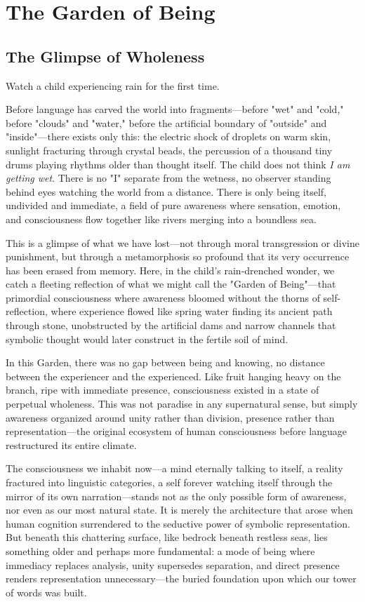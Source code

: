 \chapter{The Garden of Being}

\section{The Glimpse of Wholeness}

Watch a child experiencing rain for the first time. 

Before language has carved the world into fragments—before "wet" and "cold," before "clouds" and "water," before the artificial boundary of "outside" and "inside"—there exists only this: the electric shock of droplets on warm skin, sunlight fracturing through crystal beads, the percussion of a thousand tiny drums playing rhythms older than thought itself. The child does not think \textit{I am getting wet}. There is no "I" separate from the wetness, no observer standing behind eyes watching the world from a distance. There is only being itself, undivided and immediate, a field of pure awareness where sensation, emotion, and consciousness flow together like rivers merging into a boundless sea.

This is a glimpse of what we have lost—not through moral transgression or divine punishment, but through a metamorphosis so profound that its very occurrence has been erased from memory. Here, in the child's rain-drenched wonder, we catch a fleeting reflection of what we might call the "Garden of Being"—that primordial consciousness where awareness bloomed without the thorns of self-reflection, where experience flowed like spring water finding its ancient path through stone, unobstructed by the artificial dams and narrow channels that symbolic thought would later construct in the fertile soil of mind.

In this Garden, there was no gap between being and knowing, no distance between the experiencer and the experienced. Like fruit hanging heavy on the branch, ripe with immediate presence, consciousness existed in a state of perpetual wholeness. This was not paradise in any supernatural sense, but simply awareness organized around unity rather than division, presence rather than representation—the original ecosystem of human consciousness before language restructured its entire climate.

The consciousness we inhabit now—a mind eternally talking to itself, a reality fractured into linguistic categories, a self forever watching itself through the mirror of its own narration—stands not as the only possible form of awareness, nor even as our most natural state. It is merely the architecture that arose when human cognition surrendered to the seductive power of symbolic representation. But beneath this chattering surface, like bedrock beneath restless seas, lies something older and perhaps more fundamental: a mode of being where immediacy replaces analysis, unity supersedes separation, and direct presence renders representation unnecessary—the buried foundation upon which our tower of words was built.

